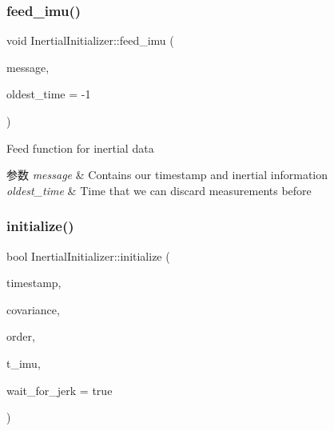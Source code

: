 \subsubsection{\texorpdfstring{feed\+\_\+imu()}{feed\_imu()}}
{\footnotesize\ttfamily void Inertial\+Initializer\+::feed\+\_\+imu (\begin{DoxyParamCaption}\item[{const \hyperlink{structov__core_1_1ImuData}{ov\+\_\+core\+::\+Imu\+Data} \&}]{message,  }\item[{double}]{oldest\+\_\+time = {\ttfamily -\/1} }\end{DoxyParamCaption})}



Feed function for inertial data 


\begin{DoxyParams}{参数}
{\em message} & Contains our timestamp and inertial information \\
\hline
{\em oldest\+\_\+time} & Time that we can discard measurements before \\
\hline
\end{DoxyParams}
\mbox{\label{classov__init_1_1InertialInitializer_aa2288d134687ccf1b7ee85ddcf982991}} 
\subsubsection{\texorpdfstring{initialize()}{initialize()}}
{\footnotesize\ttfamily bool Inertial\+Initializer\+::initialize (\begin{DoxyParamCaption}\item[{double \&}]{timestamp,  }\item[{Eigen\+::\+Matrix\+Xd \&}]{covariance,  }\item[{std\+::vector$<$ std\+::shared\+\_\+ptr$<$ \hyperlink{classov__type_1_1Type}{ov\+\_\+type\+::\+Type} $>$$>$ \&}]{order,  }\item[{std\+::shared\+\_\+ptr$<$ \hyperlink{classov__type_1_1IMU}{ov\+\_\+type\+::\+I\+MU} $>$}]{t\+\_\+imu,  }\item[{bool}]{wait\+\_\+for\+\_\+jerk = {\ttfamily true} }\end{DoxyParamCaption})}



